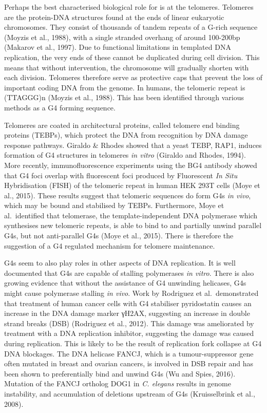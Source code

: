 \documentclass[12pt,a4paper,]{report}
\begin{document}
Perhaps the best characterised biological role for is at the telomeres.
Telomeres are the protein-DNA structures found at the ends of linear
eukaryotic chromosomes. They consist of thousands of tandem repeats of a
G-rich sequence (Moyzis et al., 1988), with a single stranded overhang
of around 100-200bp (Makarov et al., 1997). Due to functional
limitations in templated DNA replication, the very ends of these cannot
be duplicated during cell division. This means that without
intervention, the chromosome will gradually shorten with each division.
Telomeres therefore serve as protective caps that prevent the loss of
important coding DNA from the genome. In humans, the telomeric repeat is
(TTAGGG)n (Moyzis et al., 1988). This has been identified through
various methods as a G4 forming sequence.

Telomeres are coated in architectural proteins, called telomere end
binding proteins (TEBPs), which protect the DNA from recognition by DNA
damage response pathways. Giraldo \& Rhodes showed that a yeast TEBP,
RAP1, induces formation of G4 structures in telomeres \emph{in vitro}
(Giraldo and Rhodes, 1994). More recently, immunofluorescence
experiments using the BG4 antibody showed that G4 foci overlap with
fluorescent foci produced by Fluorescent \emph{In Situ} Hybridisation
(FISH) of the telomeric repeat in human HEK 293T cells (Moye et al.,
2015). These results suggest that telomeric sequences do form G4s
\emph{in vivo}, which may be bound and stabilised by TEBPs. Furthermore,
Moye et al.~identified that telomerase, the template-independent DNA
polymerase which synthesises new telomeric repeats, is able to bind to
and partially unwind parallel G4s, but not anti-parallel G4s (Moye et
al., 2015). There is therefore the suggestion of a G4 regulated
mechanism for telomere maintenance.

G4s seem to also play roles in other aspects of DNA replication. It is
well documented that G4s are capable of stalling polymerases \emph{in
vitro}. There is also growing evidence that without the assistance of G4
unwinding helicases, G4s might cause polymerase stalling \emph{in vivo}.
Work by Rodriguez et al.~demonstrated that treatment of human cancer
cells with G4 stabiliser pyridostatin causes an increase in the DNA
damage marker γH2AX, suggesting an increase in double strand breaks
(DSB) (Rodriguez et al., 2012). This damage was ameliorated by treatment
with a DNA replication inhibitor, suggesting the damage was caused
during replication. This is likely to be the result of replication fork
collapse at G4 DNA blockages. The DNA helicase FANCJ, which is a
tumour-suppressor gene often mutated in breast and ovarian cancers, is
involved in DSB repair and has been shown to preferentially bind and
unwind G4s (Wu and Spies, 2016). Mutation of the FANCJ ortholog DOG1 in
\emph{C. elegans} results in genome instability, and accumulation of
deletions upstream of G4s (Kruisselbrink et al., 2008).
\end{document}
